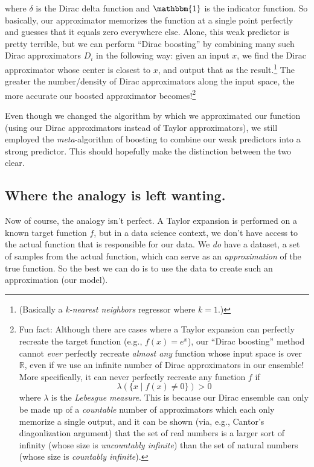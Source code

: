 \documentclass[../main/main.tex]{subfiles}
\begin{document}
where \(\delta\) is the Dirac delta function and \(\mathbbm{1}\) is the indicator function.
So basically, our approximator memorizes the function at a single point perfectly and guesses 
that it equals zero everywhere else. Alone, this weak predictor is pretty terrible, but
we can perform ``Dirac boosting'' by combining many such Dirac approximators \(D_i\) in the
following way: given an input \(x\), we find the Dirac approximator whose center is closest
to \(x\), and output that as the result.\footnote{
  (Basically a \emph{k-nearest neighbors} regressor where \(k=1\).)
} 
The greater the number/density of Dirac approximators along the input space,
the more accurate our boosted approximator becomes!\footnote{
  Fun fact: Although there are cases where a Taylor expansion can perfectly recreate the
  target function (e.g., \(f(x) = e^x\)), our ``Dirac boosting'' method cannot \emph{ever}
  perfectly recreate \emph{almost any} function whose input space is over \(\mathbb{R}\), even if
  we use an infinite number of Dirac approximators in our ensemble! More specifically,
  it can never perfectly recreate any function \(f\) if
  \[\lambda\left(\{x \mid f(x) \neq 0\}\right) > 0\]
  where \(\lambda\) is the \emph{Lebesgue measure}.
  This is because 
  our Dirac ensemble can only be made up of a \emph{countable} number of approximators which
  each only memorize a single output, and it can be shown (via, e.g., Cantor's diagonlization
  argument) that the set of real numbers is a larger sort of infinity
  (whose size is 
  \emph{uncountably infinite}) 
  than the set of natural numbers (whose size is
  \emph{countably infinite}).
}

Even though we changed the algorithm by which we approximated our function (using our Dirac
approximators instead of Taylor approximators), we still employed the \emph{meta}-algorithm
of boosting to combine our weak predictors into a strong predictor. This should hopefully make
the distinction between the two clear.

\subsection{Where the analogy is left wanting.}\label{where-the-analogy-is-left-wanting}

Now of course, the analogy isn't perfect. A Taylor expansion is performed on a known target
function \(f\), but in a data science context, we don't have access to the actual
function that is responsible for our data. We \emph{do} have a dataset, a set of samples from
the actual function, which can serve as an \emph{approximation} of the true function.
So the best we can do is to use the data to create such an approximation (our model). 
\end{document}
